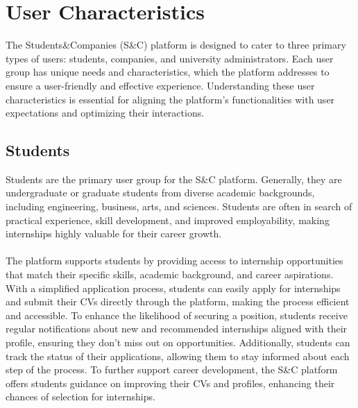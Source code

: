 \section{User Characteristics}

The Students\&Companies (S\&C) platform is designed to cater to three primary types of users: students, companies, and university administrators. Each user group has unique needs and characteristics, which the platform addresses to ensure a user-friendly and effective experience. Understanding these user characteristics is essential for aligning the platform’s functionalities with user expectations and optimizing their interactions.

\subsection{Students}
Students are the primary user group for the S\&C platform. Generally, they are undergraduate or graduate students from diverse academic backgrounds, including engineering, business, arts, and sciences. Students are often in search of practical experience, skill development, and improved employability, making internships highly valuable for their career growth. \\ \\
The platform supports students by providing access to internship opportunities that match their specific skills, academic background, and career aspirations. With a simplified application process, students can easily apply for internships and submit their CVs directly through the platform, making the process efficient and accessible. To enhance the likelihood of securing a position, students receive regular notifications about new and recommended internships aligned with their profile, ensuring they don’t miss out on opportunities. Additionally, students can track the status of their applications, allowing them to stay informed about each step of the process. To further support career development, the S\&C platform offers students guidance on improving their CVs and profiles, enhancing their chances of selection for internships.


